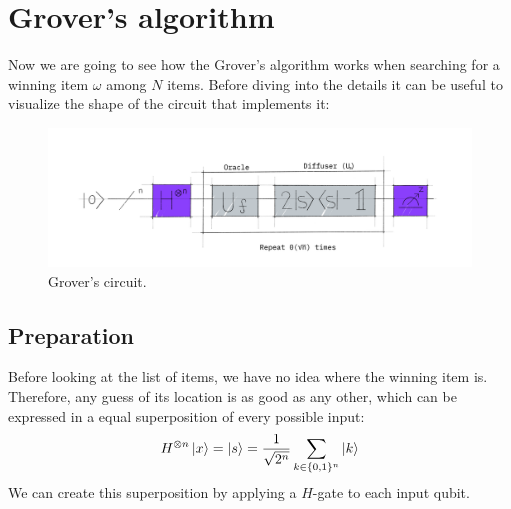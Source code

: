 \documentclass{article}
\begin{document}
\section{Grover's algorithm}

Now we are going to see how the Grover's algorithm works when searching for a
winning item $\omega$ among $N$ items.
Before diving into the details it can
be useful to visualize the shape of the circuit that implements it:
\begin{figure}[H]
  \centering
  \includegraphics[width=345pt]{Img/grover-circuit-high-level.png}
  \caption{Grover's circuit.}
\end{figure}

\subsection{Preparation}
Before looking at the list of items, we have no idea where the winning item
is. Therefore, any guess of its location is as good as any other, which can be
expressed in a equal superposition of
  every possible input:
  \[
    H^{\otimes n} \ket{x} = \ket{s} = \frac{1}{\sqrt{2^n}} \sum_{k \in
    \{0, 1\}^n}
    \ket{k}
  \]
  We can create this superposition by applying a $H$-gate to each input qubit.
\end{document}
